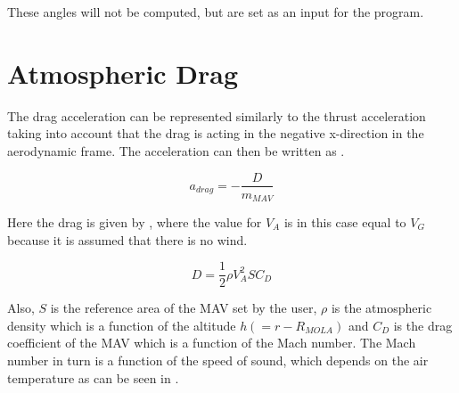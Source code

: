 
\noindent
These angles will not be computed, but are set as an input for the program.


\section{Atmospheric Drag}
\label{sec:dragModel}
The drag acceleration can be represented similarly to the thrust acceleration taking into account that the drag is acting in the negative x-direction in the aerodynamic frame. The acceleration can then be written as .

\begin{equation} \label{eq:dragModel}
a_{drag}=-\dfrac{D}{m_{MAV}}
\end{equation}


\noindent
Here the drag is given by , where the value for $V_{A}$ is in this case equal to $V_{G}$ because it is assumed that there is no wind.

\begin{equation} \label{eq:dragDragModel}
D=\dfrac{1}{2}\rho V_{A}^{2}SC_{D}
\end{equation}


\noindent
Also, $S$ is the reference area of the \ac{MAV} set by the user, $\rho$ is the atmospheric density which is a function of the altitude $h\left(=r-R_{MOLA}\right)$ and $C_{D}$ is the drag coefficient of the \ac{MAV} which is a function of the Mach number. The Mach number in turn is a function of the speed of sound, which depends on the air temperature as can be seen in .





